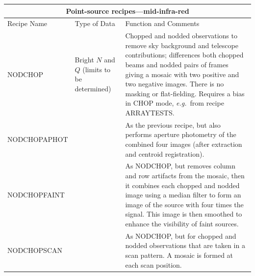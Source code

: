 \documentclass[twoside,11pt]{article}
\newcommand{\htmlref}[2]{#1}
\renewcommand{\_}{\texttt{\symbol{95}}}
\begin{document}
\begin{center}
\begin{tabular}{|l|p{25mm}|p{81mm}|}
\multicolumn{3}{c}{\large{\bf Point-source recipes---mid-infra-red}} \vspace*{1ex} \\
\hline
Recipe Name & Type of Data & Function and Comments \\ \hline
\htmlref{NOD\_CHOP}{NOD\_CHOP} &
   Bright $N$ and $Q$ (limits to be determined) &
   Chopped and nodded observations to remove sky background and telescope
   contributions; differences both chopped beams and nodded pairs of frames
   giving a mosaic with two positive and two negative images.  There
   is no masking or flat-fielding.  Requires a bias in CHOP mode,
   {\em e.g.}\ from recipe ARRAY\_TESTS.  \\ \hline
\htmlref{NOD\_CHOP\_APHOT}{NOD\_CHOP\_APHOT} & &
   As the previous recipe, but also performs aperture photometry of the
   combined four images (after extraction and centroid registration). \\ \hline
\htmlref{NOD\_CHOP\_FAINT}{NOD\_CHOP\_FAINT} & &
   As NOD\_CHOP, but removes column and row artifacts from the mosaic, then
   it combines each chopped and nodded image using a median filter to form an
   image of the source with four times the signal.  This image is then smoothed
   to enhance the visibility of faint sources. \\ \hline
\htmlref{NOD\_CHOP\_SCAN}{NOD\_CHOP\_SCAN} & &
   As NOD\_CHOP, but for chopped and nodded observations that are taken in a
   scan pattern.  A mosaic is formed at each scan position. \\ \hline
\end{tabular}
\end{center}
\end{document}
